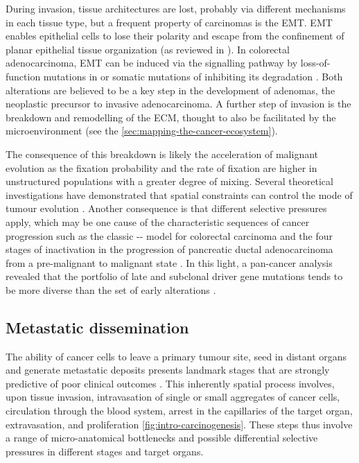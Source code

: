 During invasion, tissue architectures are lost, probably via different mechanisms in each tissue type, but a frequent property of carcinomas is the \ac{EMT}. \ac{EMT} enables epithelial cells to lose their polarity and escape from the confinement of planar epithelial tissue organization (as reviewed in \textcite{Polyak2009-fi}). In colorectal adenocarcinoma, \ac{EMT} can be induced via the  signalling pathway by loss-of-function mutations in  or somatic mutations of  inhibiting its degradation \parencite{Morin1997-ez}. Both alterations are believed to be a key step in the development of adenomas, the neoplastic precursor to invasive adenocarcinoma. A further step of invasion is the breakdown and remodelling of the \ac{ECM}, thought to also be facilitated by the microenvironment (see the \cref{sec:mapping-the-cancer-ecosystem}).

The consequence of this breakdown is likely the acceleration of malignant evolution as the fixation probability and the rate of fixation are higher in unstructured populations with a greater degree of mixing. Several theoretical investigations have demonstrated that spatial constraints can control the mode of tumour evolution \parencite{West2021-ar,Noble2022-eg}. Another consequence is that different selective pressures apply, which may be one cause of the characteristic sequences of cancer progression such as the classic -- model for colorectal carcinoma \parencite{Fearon1990-el,Gerstung2020-sg} and the four stages of  inactivation in the progression of pancreatic ductal adenocarcinoma from a pre-malignant to malignant state \parencite{Baslan2022-rb}. In this light, a pan-cancer analysis revealed that the portfolio of late and subclonal driver gene mutations tends to be more diverse than the set of early alterations \parencite{Gerstung2020-sg}.

\subsection*{Metastatic dissemination}

The ability of cancer cells to leave a primary tumour site, seed in distant organs and generate metastatic deposits presents landmark stages that are strongly predictive of poor clinical outcomes \parencite{Lambert2017-ll}. This inherently spatial process involves, upon tissue invasion, intravasation of single or small aggregates of cancer cells, circulation through the blood system, arrest in the capillaries of the target organ, extravasation, and proliferation \parencite{Fidler2003-lh} \cref{fig:intro-carcinogenesis}. These steps thus involve a range of micro-anatomical bottlenecks and possible differential selective pressures in different stages and target organs.

